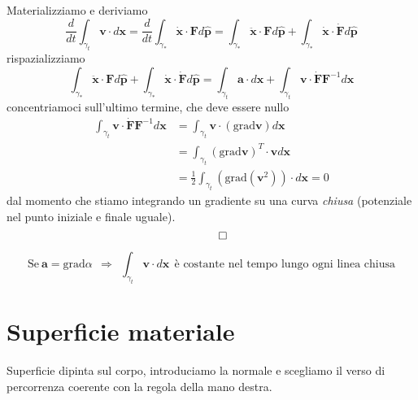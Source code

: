 \documentclass[10pt,a4paper,twoside]{book}
\begin{document}
Materializziamo e deriviamo
\begin{equation*}
\frac{d}{dt}\int _{\gamma _{t}}\mathbf{v} \cdotp d\mathbf{x} =\frac{d}{dt}\int _{\gamma _{*}}\dot{\mathbf{x}} \cdotp \mathbf{F} d\hat{\mathbf{p}} =\int _{\gamma _{*}}\ddot{\mathbf{x}} \cdotp \mathbf{F} d\hat{\mathbf{p}} +\int _{\gamma _{*}}\dot{\mathbf{x}} \cdotp \dot{\mathbf{F}} d\hat{\mathbf{p}}
\end{equation*}
rispazializziamo
\begin{equation*}
\int _{\gamma _{*}}\ddot{\mathbf{x}} \cdotp \mathbf{F} d\hat{\mathbf{p}} +\int _{\gamma _{*}}\dot{\mathbf{x}} \cdotp \dot{\mathbf{F}} d\hat{\mathbf{p}} =\int _{\gamma _{t}}\mathbf{a} \cdotp d\mathbf{x} +\int _{\gamma _{t}}\mathbf{v} \cdotp \dot{\mathbf{F}}\mathbf{F}^{-1} d\mathbf{x}
\end{equation*}
concentriamoci sull'ultimo termine, che deve essere nullo
\begin{align*}
\int _{\gamma _{t}}\mathbf{v} \cdotp \dot{\mathbf{F}}\mathbf{F}^{-1} d\mathbf{x} & =\int _{\gamma _{t}}\mathbf{v} \cdotp (\mathrm{grad}\mathbf{v}) d\mathbf{x}\\
 & =\int _{\gamma _{t}}(\mathrm{grad}\mathbf{v})^{T} \cdotp \mathbf{v} d\mathbf{x}\\
 & =\frac{1}{2}\int _{\gamma _{t}}\left(\mathrm{grad}\left(\mathbf{v}^{2}\right)\right) \cdotp d\mathbf{x} =0
\end{align*}
dal momento che stiamo integrando un gradiente su una curva \textit{chiusa} (potenziale nel punto iniziale e finale uguale).
\begin{equation*}
\qed 
\end{equation*}
\begin{corollario}
\begin{equation*}
\text{Se} \ \mathbf{a} =\mathrm{grad} \alpha \ \ \Rightarrow \ \ \int _{\gamma _{t}}\mathbf{v} \cdotp d\mathbf{x} \ \ \text{è costante nel tempo lungo ogni linea chiusa}
\end{equation*}
\end{corollario}
\section{Superficie materiale}

Superficie dipinta sul corpo, introduciamo la normale e scegliamo il verso di percorrenza coerente con la regola della mano destra.

\end{document}
